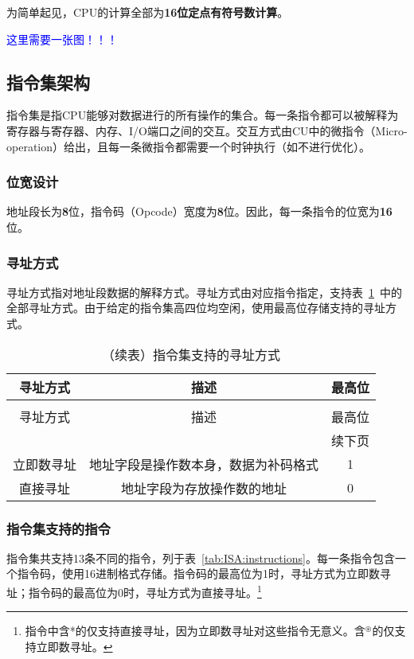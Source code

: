 \documentclass[lang=cn,a4paper,newtx]{elegantpaper}
\begin{document}
为简单起见，CPU的计算全部为\textbf{16位定点有符号数计算}。

\textcolor{blue}{这里需要一张图！！！}




\subsection{指令集架构}
指令集是指CPU能够对数据进行的所有操作的集合。每一条指令都可以被解释为寄存器与寄存器、内存、I/O端口之间的交互。交互方式由CU中的微指令（Micro-operation）给出，且每一条微指令都需要一个时钟执行（如不进行优化）。
\subsubsection{位宽设计}
地址段长为\textbf{8}位，指令码（Opcode）宽度为\textbf{8}位。因此，每一条指令的位宽为\textbf{16}位。
\subsubsection{寻址方式}
寻址方式指对地址段数据的解释方式。寻址方式由对应指令指定，支持表~\ref{tab:ISA:addressingmode}~中的全部寻址方式。由于给定的指令集高四位均空闲，使用最高位存储支持的寻址方式。
\begin{longtable}{c c c}
  \caption{指令集支持的寻址方式} \label{tab:ISA:addressingmode} \\
  \toprule
  寻址方式  & 描述 & 最高位\\
  \midrule
  \endfirsthead
  
  \caption[]{（续表）指令集支持的寻址方式} \\
  \toprule
  寻址方式  & 描述 & 最高位\\
  \midrule
  \endhead
  
  \midrule
  \multicolumn{3}{r}{续下页} \\
  \midrule
  \endfoot
  
  \bottomrule
  \endlastfoot
  
  立即数寻址   &  地址字段是操作数本身，数据为补码格式  & 1\\
  直接寻址 &  地址字段为存放操作数的地址    & 0\\
\end{longtable}

\subsubsection{指令集支持的指令}
指令集共支持13条不同的指令，列于表~\ref{tab:ISA:instructions}。每一条指令包含一个指令码，使用16进制格式存储。指令码的最高位为1时，寻址方式为立即数寻址；指令码的最高位为0时，寻址方式为直接寻址。\footnote{指令中含*的仅支持直接寻址，因为立即数寻址对这些指令无意义。含$^\circledast$的仅支持立即数寻址。}
  
\end{document}
